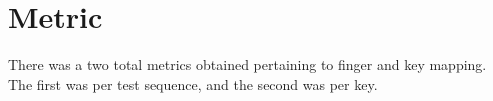 \documentclass{report}
\begin{document}






\section{Metric}
\label{section:metric}

There was a two total metrics obtained pertaining to finger and key mapping.
The first was per test sequence, and the second was per key.
\end{document}
